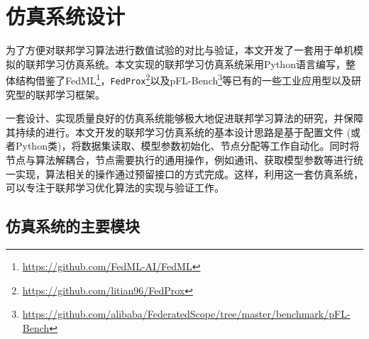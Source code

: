 \newcommand{\urlgithub}{\url{https://github.com/wenh06/fl-sim}}
\newcommand{\urlgitee}{\url{https://gitee.com/wenh06/fl-sim}}

\section{仿真系统设计}
\label{sec:chap5-design}


为了方便对联邦学习算法进行数值试验的对比与验证，本文开发了一套用于单机模拟的联邦学习仿真系统。本文实现的联邦学习仿真系统采用Python语言编写，整体结构借鉴了FedML\footnote{\url{https://github.com/FedML-AI/FedML}}\parencite{he_2020_fedml}，\texttt{FedProx}\footnote{\url{https://github.com/litian96/FedProx}}\parencite{sahu2018fedprox}以及pFL-Bench\footnote{\url{https://github.com/alibaba/FederatedScope/tree/master/benchmark/pFL-Bench}}\parencite{chen_2022_pfl_bench}等已有的一些工业应用型以及研究型的联邦学习框架。

一套设计、实现质量良好的仿真系统能够极大地促进联邦学习算法的研究，并保障其持续的进行。本文开发的联邦学习仿真系统的基本设计思路是基于配置文件 (或者Python类)，将数据集读取、模型参数初始化、节点分配等工作自动化。同时将节点与算法解耦合，节点需要执行的通用操作，例如通讯、获取模型参数等进行统一实现，算法相关的操作通过预留接口的方式完成。这样，利用这一套仿真系统，可以专注于联邦学习优化算法的实现与验证工作。

\subsection{仿真系统的主要模块}


